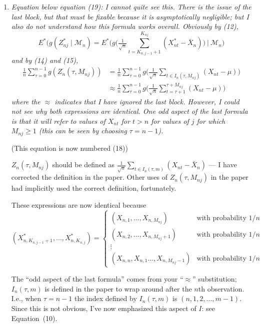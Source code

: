 \documentclass[12pt]{article}
\begin{document}
\begin{enumerate}
\item \emph{Equation below equation (19): I cannot quite see
    this. There is the issue of the last block, but that must be
    fixable because it is asymptotically negligible; but I also do not
    understand how this formula works overall. Obviously by (12),
    \begin{equation*}
      E^*(g(Z_{nj}^* \mid \mathcal{M}_n) =
      E^*\Big(g\Big(\tfrac{1}{\sqrt{n}} \sum_{t = K_{n,j-1}+1}^{K_{nj}} (X_{nt}^* - \bar X_n)\Big)
      \ \big|\ \mathcal{M}_n\Big)
    \end{equation*}
    and by (14) and (15),
    \begin{align*}
      \tfrac{1}{n} \sum_{\tau = 0}^{n-1} g(Z_n(\tau, M_{nj}))
      &= \tfrac1n \sum_{\tau = 0}^{n-1} g\Big(\tfrac1{\sqrt{n}} \sum_{t \in I_n(\tau, M_{nj})} (X_{nt} - \mu)\Big) \\
      &\approx \tfrac1n \sum_{\tau = 0}^{n-1} g\Big(\tfrac1{\sqrt{n}} \sum_{t = \tau+1}^{\tau + M_{nj}} (X_{nt} - \mu)\Big)
    \end{align*}
    where the $\approx$ indicates that I have ignored the last
    block. However, I could not see why both expressions are
    identical. One odd aspect of the last formula is that it will
    refer to values of $X_{nt}$ for $t > n$ for values of $j$ for
    which $M_{nj} \geq 1$ (this can be seen by choosing $\tau=n-1$).}

  (This equation is now numbered (18))

  $Z_n(\tau, M_{nj})$ should be defined as $\tfrac{1}{\sqrt{n}}
  \sum_{t\in I_n(\tau, m)} (X_{nt} - \bar X_n)$ --- I have corrected
  the definition in the paper. Other uses of $Z_n(\tau, M_{nj})$ in
  the paper had implicitly used the correct definition, fortunately.

  These expressions are now identical because
  \begin{equation*}
    (X_{n, K_{n,j-1}+1}^*,\dots, X_{n, K_{n,j}}^*) =
    \begin{cases}
      (X_{n,1},\dots,X_{n,M_{nj}}) & \text{with probability }1/n \\
      (X_{n,2},\dots,X_{n,M_{nj}+1}) & \text{with probability }1/n \\
      \vdots \\
      (X_{n,n}, X_{n,1}\dots,X_{n,M_{nj}-1}) & \text{with probability }1/n
    \end{cases}
  \end{equation*}

  The ``odd aspect of the last formula'' comes from your ``$\approx$''
  substitution; $I_n(\tau,m)$ is defined in the paper to wrap around
  after the $n$th observation. I.e., when $\tau = n-1$ the index
  defined by $I_n(\tau, m)$ is $(n, 1, 2,\dots, m - 1)$. Since this is
  not obvious, I've now emphasized this aspect of $I$: see Equation~(10).


\end{enumerate}
\end{document}
